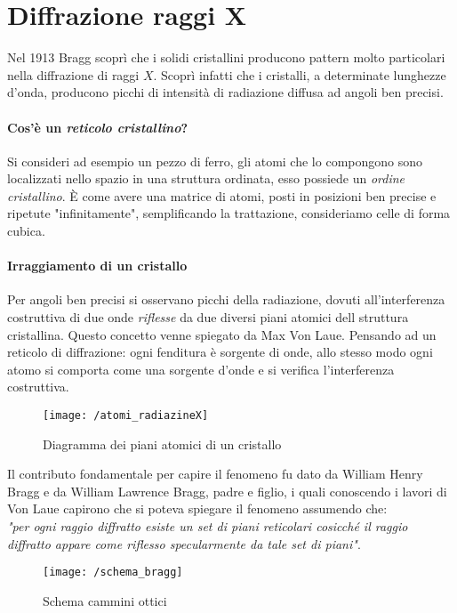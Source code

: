 

\section{Diffrazione raggi X}
Nel 1913 Bragg scoprì che i solidi cristallini producono pattern molto particolari nella diffrazione di raggi $X$.
Scoprì infatti che i cristalli, a determinate lunghezze d'onda, producono picchi di intensità di radiazione diffusa ad angoli ben precisi.

\paragraph{Cos'è un \textit{reticolo cristallino}?} 
Si consideri ad esempio un pezzo di ferro, gli atomi che lo compongono sono localizzati nello spazio in una struttura ordinata, esso possiede un \textit{ordine cristallino}.
È come avere una matrice di atomi, posti in posizioni ben precise e ripetute "infinitamente", semplificando la trattazione, consideriamo celle di forma cubica.

\paragraph{Irraggiamento di un cristallo}
Per angoli ben precisi si osservano picchi della radiazione, dovuti all'interferenza costruttiva di due onde \textit{riflesse} da due diversi piani atomici dell struttura cristallina.
Questo concetto venne spiegato da Max Von Laue.
Pensando ad un reticolo di diffrazione: ogni fenditura è sorgente di onde,
allo stesso modo ogni atomo si comporta come una sorgente d'onde e si verifica l'interferenza costruttiva.
\begin{figure}[h]
\centering
\texttt{[image: /atomi\_radiazineX]}
\caption{Diagramma dei piani atomici di un cristallo}
\end{figure}

Il contributo fondamentale per capire il fenomeno fu dato da William Henry Bragg e da William Lawrence Bragg, padre e figlio, i quali conoscendo i lavori di Von Laue capirono che si poteva spiegare il fenomeno assumendo che: \\ 
\textit{"per ogni raggio diffratto esiste un set di piani reticolari cosicché il raggio diffratto appare come riflesso specularmente da tale set di piani"}. \\

\begin{figure}[h]
\centering
\texttt{[image: /schema\_bragg]}
\caption{Schema cammini ottici}
\label{cammino_ottico}
\end{figure}

